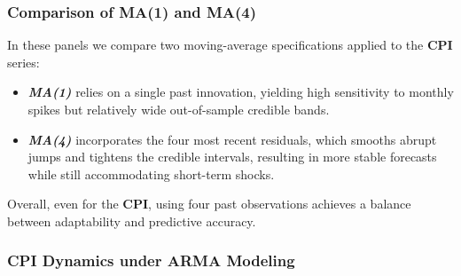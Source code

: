 \documentclass{Configuration_Files/PoliMi3i_thesis}
\begin{document}



\newpage
\subsubsection*{Comparison of MA(1) and MA(4)}

In these panels we compare two moving-average specifications applied to the \textbf{CPI} series:
\begin{itemize}
  \item \textbf{\textit{MA(1)}} relies on a single past innovation, yielding high sensitivity to monthly spikes but relatively wide out-of-sample credible bands.
  \item \textbf{\textit{MA(4)}} incorporates the four most recent residuals, which smooths abrupt jumps and tightens the credible intervals, resulting in more stable forecasts while still accommodating short-term shocks.
\end{itemize}

Overall, even for the \textbf{CPI}, using four past observations achieves a balance between adaptability and predictive accuracy.



\subsubsection{CPI Dynamics under ARMA Modeling}
\end{document}
